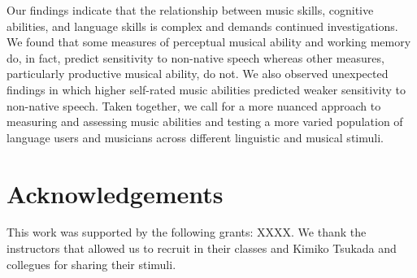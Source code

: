 \documentclass[a4paper]{article}
\begin{document}
Our findings indicate that the relationship between music skills, cognitive abilities, and language skills is complex and demands continued investigations. We found that some measures of perceptual musical ability and working memory do, in fact, predict sensitivity to non-native speech whereas other measures, particularly productive musical ability, do not. We also observed unexpected findings in which higher self-rated music abilities predicted weaker sensitivity to non-native speech. Taken together, we call for a more nuanced approach to measuring and assessing music abilities and testing a more varied population of language users and musicians across different linguistic and musical stimuli.

\section{Acknowledgements}

This work was supported by the following grants: XXXX. We thank the instructors that allowed us to recruit in their classes and Kimiko Tsukada and collegues for sharing their stimuli.



\end{document}
